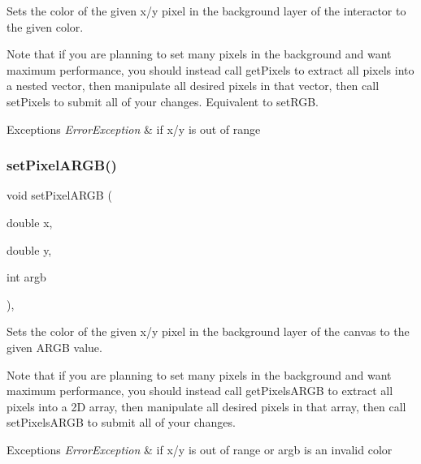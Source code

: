 Sets the color of the given x/y pixel in the background layer of the interactor to the given color. 

Note that if you are planning to set many pixels in the background and want maximum performance, you should instead call get\+Pixels to extract all pixels into a nested vector, then manipulate all desired pixels in that vector, then call set\+Pixels to submit all of your changes. Equivalent to set\+R\+GB.


\begin{DoxyExceptions}{Exceptions}
{\em Error\+Exception} & if x/y is out of range \\
\hline
\end{DoxyExceptions}
\mbox{\label{classsgl_1_1GCanvas_ae189342d4b4235efa2ece08e08758499}} 
\subsubsection{\texorpdfstring{set\+Pixel\+A\+R\+G\+B()}{setPixelARGB()}\hspace{0.1cm}{\footnotesize\ttfamily [1/2]}}
{\footnotesize\ttfamily void set\+Pixel\+A\+R\+GB (\begin{DoxyParamCaption}\item[{double}]{x,  }\item[{double}]{y,  }\item[{int}]{argb }\end{DoxyParamCaption})\hspace{0.3cm}{\ttfamily [override]}, {\ttfamily [virtual]}}



Sets the color of the given x/y pixel in the background layer of the canvas to the given A\+R\+GB value. 

Note that if you are planning to set many pixels in the background and want maximum performance, you should instead call get\+Pixels\+A\+R\+GB to extract all pixels into a 2D array, then manipulate all desired pixels in that array, then call set\+Pixels\+A\+R\+GB to submit all of your changes.


\begin{DoxyExceptions}{Exceptions}
{\em Error\+Exception} & if x/y is out of range or argb is an invalid color \\
\hline
\end{DoxyExceptions}


